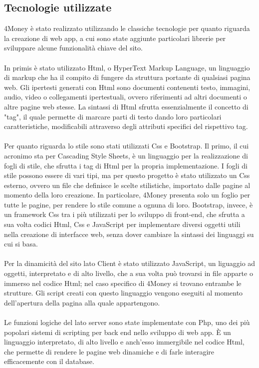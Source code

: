 \documentclass[binding=0.6cm, oneside, noexaminfo, italian]{sapthesis}
\begin{document}
\subsection{Tecnologie utilizzate}
4Money è stato realizzato utilizzando le classiche tecnologie per quanto riguarda la creazione di web app, a cui sono state aggiunte particolari librerie per sviluppare alcune funzionalità chiave del sito. \\ \\
In primis è stato utilizzato Html, o HyperText Markup Language, un linguaggio di markup che ha il compito di fungere da struttura portante di qualsiasi pagina web. Gli ipertesti generati con Html sono documenti contenenti testo, immagini, audio, video o collegamenti ipertestuali, ovvero riferimenti ad altri documenti o altre pagine web stesse. La sintassi di Html sfrutta essenzialmente il concetto di "tag", il quale permette di marcare parti di testo dando loro particolari caratteristiche, modificabili attraverso degli attributi specifici del rispettivo tag. \\ \\
Per quanto riguarda lo stile sono stati utilizzati Css e Bootstrap. Il primo, il cui acronimo sta per Cascading Style Sheets, è un linguaggio per la realizzazione di fogli di stile, che sfrutta i tag di Html per la propria implementazione. I fogli di stile possono essere di vari tipi, ma per questo progetto è stato utilizzato un Css esterno, ovvero un file che definisce le scelte stilistiche, importato dalle pagine al momento della loro creazione. In particolare, 4Money presenta solo un foglio per tutte le pagine, per rendere lo stile comune a ognuna di loro. Bootstrap, invece, è un framework Css tra i più utilizzati per lo sviluppo di front-end, che sfrutta a sua volta codici Html, Css e JavaScript per implementare diversi oggetti utili nella creazione di interfacce web, senza dover cambiare la sintassi dei linguaggi su cui si basa. \\ \\
Per la dinamicità del sito lato Client è stato utilizzato JavaScript, un liguaggio ad oggetti, interpretato e di alto livello, che a sua volta può trovarsi in file apparte o immerso nel codice Html; nel caso specifico di 4Money si trovano entrambe le strutture. Gli script creati con questo linguaggio vengono eseguiti al momento dell'apertura della pagina alla quale appartengono. \\ \\
Le funzioni logiche del lato server sono state implementate con Php, uno dei più popolari sistemi di scripting per back end nello sviluppo di web app. \MakeUppercase{è} un linguaggio interpretato, di alto livello e anch'esso immergibile nel codice Html, che permette di rendere le pagine web dinamiche e di farle interagire efficacemente con il database. \\ \\
\end{document}
